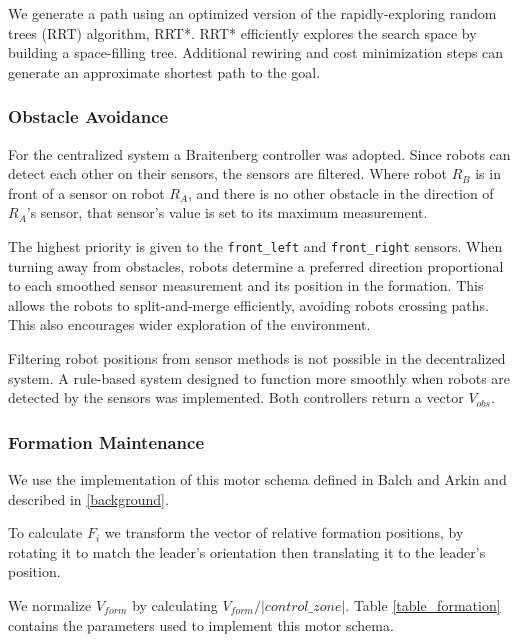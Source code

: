 \documentclass[letterpaper, 10 pt, conference]{ieeeconf}  %
\begin{document}
We generate a path using an optimized version of the rapidly-exploring random trees (RRT) algorithm, RRT*. RRT* efficiently explores the search space by building a space-filling tree. Additional rewiring and cost minimization steps can generate an approximate shortest path to the goal.

\subsubsection*{Obstacle Avoidance}

For the centralized system a Braitenberg controller was adopted. Since robots can detect each other on their sensors, the sensors are filtered. Where robot $R_B$ is in front of a sensor on robot $R_A$, and there is no other obstacle in the direction of $R_A$'s sensor, that sensor's value is set to its maximum measurement.

The highest priority is given to the \texttt{front\_left} and \texttt{front\_right} sensors. When turning away from obstacles, robots determine a preferred direction proportional to each smoothed sensor measurement and its position in the formation. This allows the robots to split-and-merge efficiently, avoiding robots crossing paths. This also encourages wider exploration of the environment.

Filtering robot positions from sensor methods is not possible in the decentralized system. A rule-based system designed to function more smoothly when robots are detected by the sensors was implemented.
Both controllers return a vector $V_{obs}$.

\subsubsection*{Formation Maintenance}

We use the implementation of this motor schema defined in Balch and Arkin and described in \ref{background}. 

To calculate $F_i$ we transform the vector of relative formation positions, by rotating it to match the leader's orientation then translating it to the leader's position.

We normalize $V_{form}$ by calculating $V_{form}/\lvert control\_zone\rvert$. Table \ref{table_formation} contains the parameters used to implement this motor schema.
\end{document}
